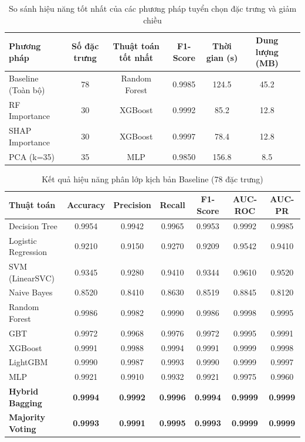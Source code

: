\begin{table}[htbp]
\centering
\caption{So sánh hiệu năng tốt nhất của các phương pháp tuyển chọn đặc trưng và giảm chiều}
\label{tab:summary_comparison}
\begin{tabular*}{\textwidth}{@{\extracolsep{\fill}}lcccccc@{}}
\toprule
\textbf{Phương pháp} & \textbf{Số đặc trưng} & \textbf{Thuật toán tốt nhất} & \textbf{F1-Score} & \textbf{Thời gian (s)} & \textbf{Dung lượng (MB)} \\ \midrule
Baseline (Toàn bộ) & 78 & Random Forest & 0.9985 & 124.5 & 45.2 \\
RF Importance & 30 & XGBoost & 0.9992 & 85.2 & 12.8 \\
SHAP Importance & 30 & XGBoost & 0.9997 & 78.4 & 12.8 \\
PCA (k=35) & 35 & MLP & 0.9850 & 156.8 & 8.5 \\ \bottomrule
\end{tabular*}
\end{table}

\begin{table}[htbp]
\centering
\caption{Kết quả hiệu năng phân lớp kịch bản Baseline (78 đặc trưng)}
\label{tab:exp0_ml_metrics}
\begin{tabular*}{\textwidth}{@{\extracolsep{\fill}}lcccccc@{}}
\toprule
\textbf{Thuật toán} & \textbf{Accuracy} & \textbf{Precision} & \textbf{Recall} & \textbf{F1-Score} & \textbf{AUC-ROC} & \textbf{AUC-PR} \\ 
\midrule
Decision Tree          & 0.9954 & 0.9942 & 0.9965 & 0.9953 & 0.9992 & 0.9985 \\
Logistic Regression    & 0.9210 & 0.9150 & 0.9270 & 0.9209 & 0.9542 & 0.9410 \\
SVM (LinearSVC)        & 0.9345 & 0.9280 & 0.9410 & 0.9344 & 0.9610 & 0.9520 \\
Naive Bayes            & 0.8520 & 0.8410 & 0.8630 & 0.8519 & 0.8845 & 0.8120 \\
Random Forest          & 0.9986 & 0.9982 & 0.9990 & 0.9986 & 0.9998 & 0.9995 \\
GBT                    & 0.9972 & 0.9968 & 0.9976 & 0.9972 & 0.9995 & 0.9991 \\
XGBoost                & 0.9991 & 0.9988 & 0.9994 & 0.9991 & 0.9999 & 0.9998 \\
LightGBM               & 0.9990 & 0.9987 & 0.9993 & 0.9990 & 0.9999 & 0.9997 \\
MLP                    & 0.9921 & 0.9910 & 0.9932 & 0.9921 & 0.9975 & 0.9960 \\
\midrule
\textbf{Hybrid Bagging}   & \textbf{0.9994} & \textbf{0.9992} & \textbf{0.9996} & \textbf{0.9994} & \textbf{0.9999} & \textbf{0.9999} \\
\textbf{Majority Voting}  & \textbf{0.9993} & \textbf{0.9991} & \textbf{0.9995} & \textbf{0.9993} & \textbf{0.9999} & \textbf{0.9999} \\
\bottomrule
\end{tabular*}
\end{table}

